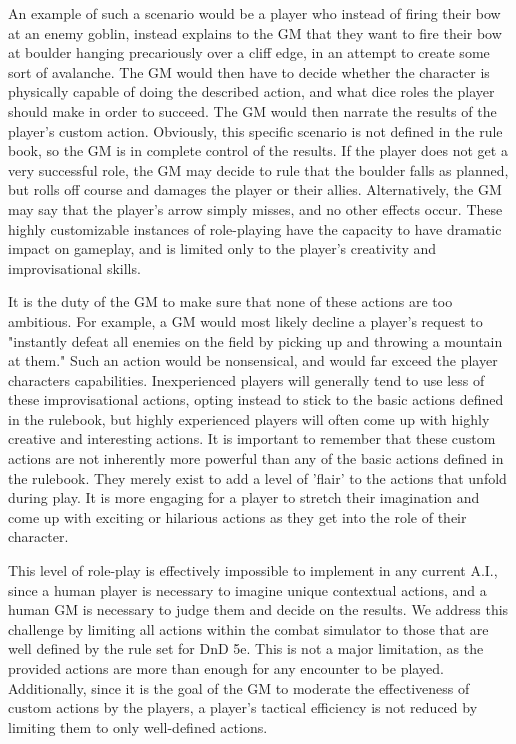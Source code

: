 \documentclass[12pt,a4paper]{report}
\begin{document}
		An example of such a scenario would be a player who instead of firing their bow at an enemy goblin, instead explains to the GM that they want to fire their bow at boulder hanging precariously over a cliff edge, in an attempt to create some sort of avalanche. The GM would then have to decide whether the character is physically capable of doing the described action, and what dice roles the player should make in order to succeed. The GM would then narrate the results of the player's custom action. Obviously, this specific scenario is not defined in the rule book, so the GM is in complete control of the results. If the player does not get a very successful role, the GM may decide to rule that the boulder falls as planned, but rolls off course and damages the player or their allies. Alternatively, the GM may say that the player's arrow simply misses, and no other effects occur. These highly customizable instances of role-playing have the capacity to have dramatic impact on gameplay, and is limited only to the player's creativity and improvisational skills. 
		
		It is the duty of the GM to make sure that none of these actions are too ambitious. For example, a GM would most likely decline a player's request to "instantly defeat all enemies on the field by picking up and throwing a mountain at them." Such an action would be nonsensical, and would far exceed the player characters capabilities. Inexperienced players will generally tend to use less of these improvisational actions, opting instead to stick to the basic actions defined in the rulebook, but highly experienced players will often come up with highly creative and interesting actions. It is important to remember that these custom actions are not inherently more powerful than any of the basic actions defined in the rulebook. They merely exist to add a level of 'flair' to the actions that unfold during play. It is more engaging for a player to stretch their imagination and come up with exciting or hilarious actions as they get into the role of their character. 
		
		 This level of role-play is effectively impossible to implement in any current A.I., since a human player is necessary to imagine unique contextual actions, and a human GM is necessary to judge them and decide on the results. We address this challenge by limiting all actions within the combat simulator to those that are well defined by the rule set for DnD 5e. This is not a major limitation, as the provided actions are more than enough for any encounter to be played. Additionally, since it is the goal of the GM to moderate the effectiveness of custom actions by the players, a player's tactical efficiency is not reduced by limiting them to only well-defined actions. 
\end{document}
